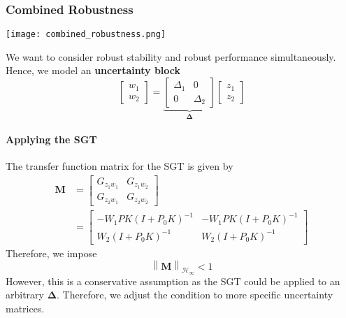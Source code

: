\subsubsection{Combined Robustness}
\begin{center}
    \texttt{[image: combined\_robustness.png]}
\end{center}
We want to consider robust stability and robust performance simultaneously. Hence, we model an \textbf{uncertainty block}
\begin{equation*}
    \begin{bmatrix}
        w_1 \\
        w_2
    \end{bmatrix}
    =\underbrace{\begin{bmatrix}
            \Delta_1 & 0        \\
            0        & \Delta_2
        \end{bmatrix}}_{\boldsymbol{\Delta}}
    \begin{bmatrix}z_1 \\
        z_2
    \end{bmatrix}
\end{equation*}

\paragraph{Applying the SGT}

The transfer function matrix for the SGT is given by
\begin{align*}
    \mathbf{M} & =
    \begin{bmatrix}
        G_{{z_{1}w_{1}}} & G_{{z_{1}w_{2}}} \\
        G_{{z_{2}w_{1}}} & G_{{z_{2}w_{2}}}
    \end{bmatrix}                     \\
               & =\begin{bmatrix}
                      -W_1PK(I+P_0K)^{-1} & -W_1PK(I+P_0K)^{-1} \\
                      W_2(I+P_0K)^{-1}    & W_2(I+P_0K)^{-1}
                  \end{bmatrix}
\end{align*}
Therefore, we impose
\begin{equation*}
    \left\|\mathbf{M}\right\|_{\mathcal{H}_\infty}<1
\end{equation*}
However, this is a conservative assumption as the SGT could be applied to an arbitrary $\boldsymbol{\Delta}$. Therefore, we adjust the condition to more specific uncertainty matrices.

